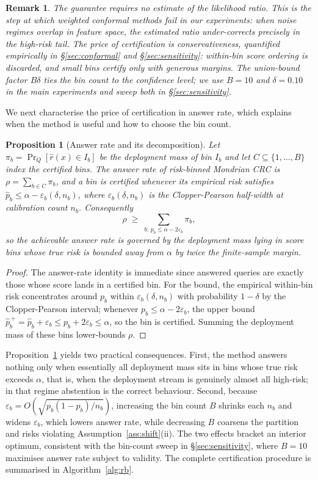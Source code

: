 \documentclass[sn-basic]{sn-jnl}
\theoremstyle{thmstyleone}
\newtheorem{proposition}{Proposition}
\theoremstyle{thmstyletwo}
\newtheorem{remark}{Remark}
\begin{document}
\begin{remark}
The guarantee requires no estimate of the likelihood ratio. This is the
step at which weighted conformal methods fail in our experiments: when
noise regimes overlap in feature space, the estimated ratio
under-corrects precisely in the high-risk tail. The price of
certification is conservativeness, quantified empirically in
\S\ref{sec:conformal} and \S\ref{sec:sensitivity}: within-bin score
ordering is discarded, and small bins certify only with generous
margins. The union-bound factor $B\delta$ ties the bin count to the
confidence level; we use $B = 10$ and $\delta = 0.10$ in the main
experiments and sweep both in \S\ref{sec:sensitivity}.
\end{remark}

We next characterise the price of certification in answer rate, which
explains when the method is useful and how to choose the bin count.

\begin{proposition}[Answer rate and its decomposition]\label{prop:eff}
Let $\pi_b = \Pr_Q[\hat r(x) \in I_b]$ be the deployment mass of bin
$I_b$ and let $C \subseteq \{1, \dots, B\}$ index the certified bins.
The answer rate of risk-binned Mondrian CRC is
$\rho = \sum_{b \in C} \pi_b$, and a bin is certified whenever its
empirical risk satisfies
$\widehat p_b \le \alpha - \varepsilon_b(\delta, n_b)$, where
$\varepsilon_b(\delta, n_b)$ is the Clopper-Pearson half-width at
calibration count $n_b$. Consequently
\[
\rho \;\ge\; \sum_{b:\, p_b \le \alpha - 2\varepsilon_b} \pi_b ,
\]
so the achievable answer rate is governed by the deployment mass lying
in score bins whose true risk is bounded away from $\alpha$ by twice
the finite-sample margin.
\end{proposition}

\begin{proof}
The answer-rate identity is immediate since answered queries are exactly
those whose score lands in a certified bin. For the bound, the empirical
within-bin risk concentrates around $p_b$ within
$\varepsilon_b(\delta, n_b)$ with probability $1 - \delta$ by the
Clopper-Pearson interval; whenever $p_b \le \alpha - 2\varepsilon_b$,
the upper bound $\widehat p^{\,+}_b = \widehat p_b + \varepsilon_b
\le p_b + 2\varepsilon_b \le \alpha$, so the bin is certified. Summing
the deployment mass of these bins lower-bounds $\rho$.
\end{proof}

Proposition~\ref{prop:eff} yields two practical consequences. First,
the method answers nothing only when essentially all deployment mass
sits in bins whose true risk exceeds $\alpha$, that is, when the
deployment stream is genuinely almost all high-risk; in that regime
abstention is the correct behaviour. Second, because
$\varepsilon_b = O(\sqrt{p_b(1 - p_b)/n_b})$, increasing the bin count
$B$ shrinks each $n_b$ and widens $\varepsilon_b$, which lowers answer
rate, while decreasing $B$ coarsens the partition and risks violating
Assumption~\ref{ass:shift}(ii). The two effects bracket an interior
optimum, consistent with the bin-count sweep in
\S\ref{sec:sensitivity}, where $B = 10$ maximises answer rate subject
to validity. The complete certification procedure is summarised in
Algorithm~\ref{alg:rb}.
\end{document}
